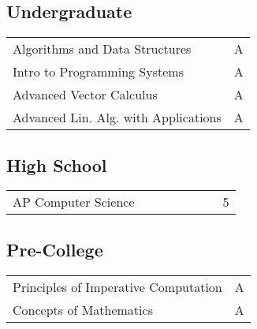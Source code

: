 \documentclass[]{deedy-resume-openfont}
\begin{document}
\begin{minipage}[t]{0.39\textwidth}
\subsection{Undergraduate}
\color{primary}
\begin{tabular}{lr}
Algorithms and Data Structures       & A \\
Intro to Programming Systems         & A \\
Advanced Vector Calculus             & A \\
Advanced Lin. Alg. with Applications & A
\end{tabular}
\sectionsep

\subsection{High School}
\begin{tabular}{lllllllr}
AP Computer Science & & & & & & & 5
\end{tabular}
\sectionsep

\subsection{Pre-College}
\begin{tabular}{lr}
Principles of Imperative Computation       & A \\
Concepts of Mathematics & A
\end{tabular}







\end{minipage}
\end{document}
